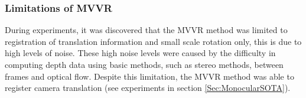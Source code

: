\subsubsection{Limitations of MVVR}

During experiments, it was discovered that the MVVR method was limited to registration of translation information and small scale rotation only, this is due to high levels of noise. These high noise levels  were caused by the difficulty in computing depth data using basic methods, such as stereo methods, between frames and optical flow. Despite this limitation, the MVVR method was able to register camera translation (see experiments in section \ref{Sec:MonocularSOTA}).  